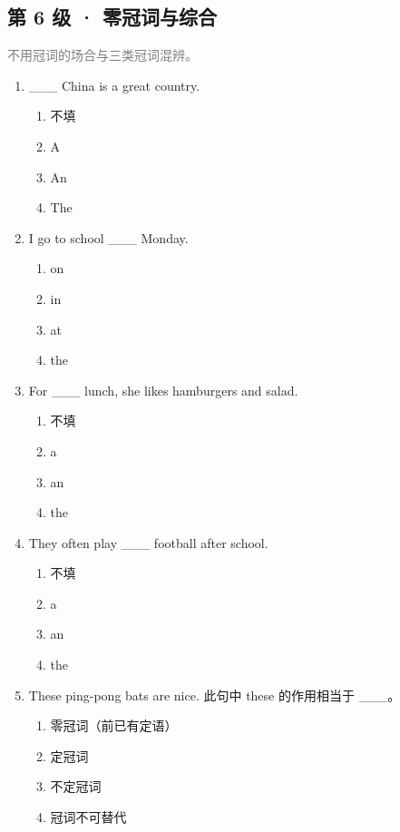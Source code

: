 \documentclass[11pt,a4paper]{ctexart}
\begin{document}
\subsection*{第 6 级 · 零冠词与综合}
\noindent\textcolor{gray}{不用冠词的场合与三类冠词混辨。}\par\smallskip
\begin{enumerate}[leftmargin=*,itemsep=4pt]
\item \_\_\_ China is a great country.
\begin{enumerate}[label=\Alph*.,leftmargin=2em,itemsep=1pt,topsep=2pt]
\item 不填
\item A
\item An
\item The
\end{enumerate}
\item I go to school \_\_\_ Monday.
\begin{enumerate}[label=\Alph*.,leftmargin=2em,itemsep=1pt,topsep=2pt]
\item on
\item in
\item at
\item the
\end{enumerate}
\item For \_\_\_ lunch, she likes hamburgers and salad.
\begin{enumerate}[label=\Alph*.,leftmargin=2em,itemsep=1pt,topsep=2pt]
\item 不填
\item a
\item an
\item the
\end{enumerate}
\item They often play \_\_\_ football after school.
\begin{enumerate}[label=\Alph*.,leftmargin=2em,itemsep=1pt,topsep=2pt]
\item 不填
\item a
\item an
\item the
\end{enumerate}
\item These ping-pong bats are nice. 此句中 these 的作用相当于 \_\_\_。
\begin{enumerate}[label=\Alph*.,leftmargin=2em,itemsep=1pt,topsep=2pt]
\item 零冠词（前已有定语）
\item 定冠词
\item 不定冠词
\item 冠词不可替代

\end{enumerate}
\end{enumerate}
\end{document}
